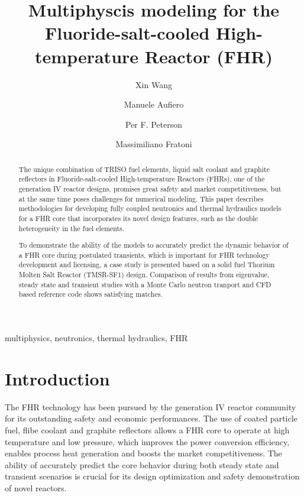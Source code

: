 \documentclass{elsarticle}
\begin{document}
\begin{frontmatter}

\title{Multiphyscis modeling for the Fluoride-salt-cooled High-temperature Reactor (FHR)}
 
\author[ucb]{Xin Wang } 
\author{Manuele Aufiero}
\author{Per F. Peterson}
\author{Massimiliano Fratoni}
\address[ucb]{University of California, Berkeley, Department of Nuclear Engineering, Berkeley, CA 94720-1730 USA}


\begin{abstract}
The unique combination of TRISO fuel elements, liquid salt coolant and graphite reflectors in Fluoride-salt-cooled High-temperature Reactors (FHRs), one of the generation IV reactor designs, promises great safety and market competitiveness, but at the same time poses challenges for numerical modeling. This paper describes methodologies for developing fully coupled neutronics and thermal hydraulics models for a FHR core that incorporates its novel design features, such as the double heterogeneity in the fuel elements. 
 
 To demonstrate the ability of the models to accurately predict the dynamic behavior of a FHR core during postulated transients, which is important for FHR technology development and licensing, a case study is presented based on a solid fuel Thorium Molten Salt Reactor (TMSR-SF1) design. Comparison of results from eigenvalue, steady state and transient studies with a Monte Carlo neutron tranport and CFD based reference code shows satisfying matches.
 
\end{abstract}

\begin{keyword}
  multiphysics, neutronics, thermal hydraulics, FHR
\end{keyword}

\end{frontmatter}


\section{Introduction}
\label{sec:introduction}
The FHR technology has been pursued by the generation IV reactor community for its outstanding safety and economic performances. The use of coated particle fuel, flibe coolant and graphite reflectors allows a FHR core to operate at high temperature and low pressure, which improves the power conversion efficiency, enables process heat generation and boosts the market competitiveness. 
The ability of accurately predict the core behavior during both steady state and transient scenarios is crucial for its design optimization and safety demonstration of novel reactors.
\end{document}

